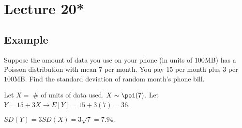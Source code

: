 \section{Lecture 20*}
\subsection{Example}
Suppose the amount of data you use on your phone (in units of $ 100 $MB) has
a Poisson distribution with mean $ 7 $ per month. You pay $ 15 $ per
month plus $ 3 $ per $ 100 $MB. Find the standard deviation of random
month's phone bill.

Let $ X= $ \# of units of data used. $ X \thicksim \poi(7) $. Let
$ Y=15+3X\rightarrow E[Y]=15+3(7)=36 $. 

$ SD(Y)=3SD(X)=3\sqrt{7}=7.94. $